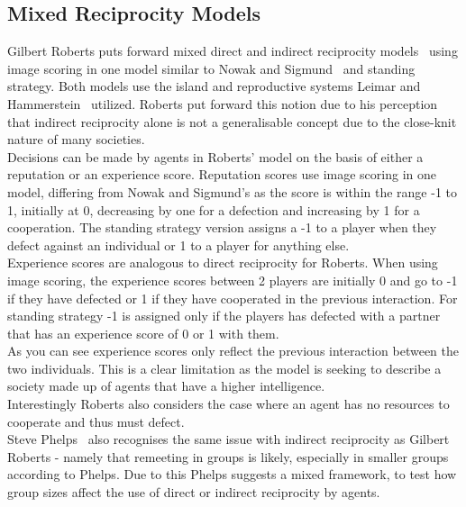 \documentclass[twoside,twocolumn]{article}
\begin{document}
\subsection{Mixed Reciprocity Models}
Gilbert Roberts puts forward mixed direct and indirect reciprocity models~\cite{evoldirindir} using image scoring in one model similar to Nowak and Sigmund~\cite{evol_indirect_image} and standing strategy. Both models use the island and reproductive systems Leimar and Hammerstein~\cite{leimarhammer} utilized. Roberts put forward this notion due to his perception that indirect reciprocity alone is not a generalisable concept due to the close-knit nature of many societies.\\
Decisions can be made by agents in Roberts' model on the basis of either a reputation or an experience score. Reputation scores use image scoring in one model, differing from Nowak and Sigmund's as the score is within the range -1 to 1, initially at 0, decreasing by one for a defection and increasing by 1 for a cooperation. The standing strategy version assigns a -1 to a player when they defect against an individual or 1 to a player for anything else.\\
Experience scores are analogous to direct reciprocity for Roberts. When using image scoring, the experience scores between 2 players are initially 0 and go to -1 if they have defected or 1 if they have cooperated in the previous interaction. For standing strategy -1 is assigned only if the players has defected with a partner that has an experience score of 0 or 1 with them.\\
As you can see experience scores only reflect the previous interaction between the two individuals. This is a clear limitation as the model is seeking to describe a society made up of agents that have a higher intelligence.\\
Interestingly Roberts also considers the case where an agent has no resources to cooperate and thus must defect.\\
Steve Phelps~\cite{phelps_game_theoretic_analysis} also recognises the same issue with indirect reciprocity as Gilbert Roberts - namely that remeeting in groups is likely, especially in smaller groups according to Phelps. Due to this Phelps suggests a mixed framework, to test how group sizes affect the use of direct or indirect reciprocity by agents.
 
\end{document}
